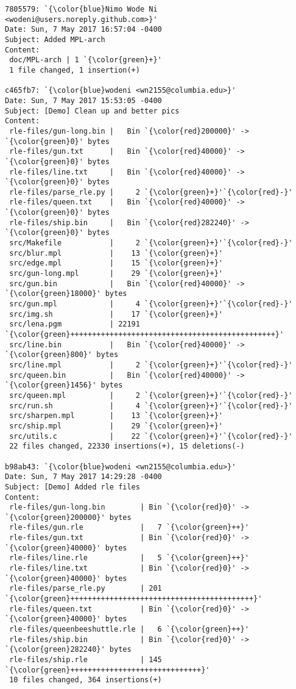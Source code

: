 \begin{lstlisting}
7805579: `{\color{blue}Nimo Wode Ni <wodeni@users.noreply.github.com>}'
Date: Sun, 7 May 2017 16:57:04 -0400
Subject: Added MPL-arch
Content: 
 doc/MPL-arch | 1 `{\color{green}+}'
 1 file changed, 1 insertion(+)

c465fb7: `{\color{blue}wodeni <wn2155@columbia.edu>}'
Date: Sun, 7 May 2017 15:53:05 -0400
Subject: [Demo] Clean up and better pics
Content: 
 rle-files/gun-long.bin |   Bin `{\color{red}200000}' -> `{\color{green}0}' bytes
 rle-files/gun.txt      |   Bin `{\color{red}40000}' -> `{\color{green}0}' bytes
 rle-files/line.txt     |   Bin `{\color{red}40000}' -> `{\color{green}0}' bytes
 rle-files/parse_rle.py |     2 `{\color{green}+}'`{\color{red}-}'
 rle-files/queen.txt    |   Bin `{\color{red}40000}' -> `{\color{green}0}' bytes
 rle-files/ship.bin     |   Bin `{\color{red}282240}' -> `{\color{green}0}' bytes
 src/Makefile           |     2 `{\color{green}+}'`{\color{red}-}'
 src/blur.mpl           |    13 `{\color{green}+}'
 src/edge.mpl           |    15 `{\color{green}+}'
 src/gun-long.mpl       |    29 `{\color{green}+}'
 src/gun.bin            |   Bin `{\color{red}40000}' -> `{\color{green}18000}' bytes
 src/gun.mpl            |     4 `{\color{green}+}'`{\color{red}-}'
 src/img.sh             |    17 `{\color{green}+}'
 src/lena.pgm           | 22191 `{\color{green}+++++++++++++++++++++++++++++++++++++++++++++++}'
 src/line.bin           |   Bin `{\color{red}40000}' -> `{\color{green}800}' bytes
 src/line.mpl           |     2 `{\color{green}+}'`{\color{red}-}'
 src/queen.bin          |   Bin `{\color{red}40000}' -> `{\color{green}1456}' bytes
 src/queen.mpl          |     2 `{\color{green}+}'`{\color{red}-}'
 src/run.sh             |     4 `{\color{green}+}'`{\color{red}-}'
 src/sharpen.mpl        |    13 `{\color{green}+}'
 src/ship.mpl           |    29 `{\color{green}+}'
 src/utils.c            |    22 `{\color{green}+}'`{\color{red}-}'
 22 files changed, 22330 insertions(+), 15 deletions(-)

b98ab43: `{\color{blue}wodeni <wn2155@columbia.edu>}'
Date: Sun, 7 May 2017 14:29:28 -0400
Subject: [Demo] Added rle files
Content: 
 rle-files/gun-long.bin        | Bin `{\color{red}0}' -> `{\color{green}200000}' bytes
 rle-files/gun.rle             |   7 `{\color{green}++}'
 rle-files/gun.txt             | Bin `{\color{red}0}' -> `{\color{green}40000}' bytes
 rle-files/line.rle            |   5 `{\color{green}++}'
 rle-files/line.txt            | Bin `{\color{red}0}' -> `{\color{green}40000}' bytes
 rle-files/parse_rle.py        | 201 `{\color{green}++++++++++++++++++++++++++++++++++++++++++}'
 rle-files/queen.txt           | Bin `{\color{red}0}' -> `{\color{green}40000}' bytes
 rle-files/queenbeeshuttle.rle |   6 `{\color{green}++}'
 rle-files/ship.bin            | Bin `{\color{red}0}' -> `{\color{green}282240}' bytes
 rle-files/ship.rle            | 145 `{\color{green}++++++++++++++++++++++++++++++}'
 10 files changed, 364 insertions(+)


\end{lstlisting}
